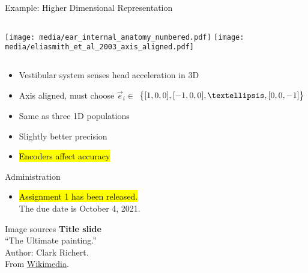 \documentclass[handout,aspectratio=169]{beamer}
\begin{document}
\begin{frame}{Example: Higher Dimensional Representation}
	\begin{columns}[b]
		\centering
		\texttt{[image: media/ear\_internal\_anatomy\_numbered.pdf]}
		\centering
		\texttt{[image: media/eliasmith\_et\_al\_2003\_axis\_aligned.pdf]}%
	\end{columns}
	\begin{multicols}{2}
		\begin{itemize}
			\item Vestibular system senses head acceleration in 3D
			\item Axis aligned, must choose $\vec e_i \in$
			$\big\{ [1, 0, 0], [-1, 0, 0], \textellipsis, [0, 0, -1] \big\}$
			\columnbreak
			\item Same as three 1D populations
			\item Slightly better precision
			\item<2-> \hl{Encoders affect accuracy}
		\end{itemize}
	\end{multicols}
\end{frame}

\backupbegin

\begin{frame}{Administration}
	\begin{itemize}
		\setlength{\itemsep}{0.75cm}
		\item \hl{Assignment 1 has been released.}\\[0.25cm]
		The due date is October 4, 2021.
	\end{itemize}
\end{frame}

\begin{frame}[noframenumbering]{Image sources}
	\small
	\textbf{Title slide}\\\enquote{The Ultimate painting.}\\Author: Clark Richert.\\From \href{https://commons.wikimedia.org/wiki/File:\%22The_Ultimate_painting\%22.jpg}{Wikimedia}.
\end{frame}


\backupend
\end{document}
